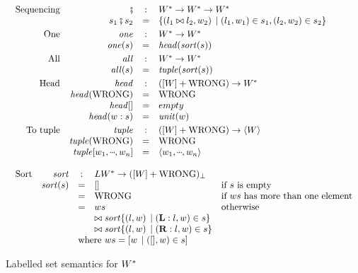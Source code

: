 \begin{figure}
$$\begin{array}{l}
\begin{array}{rrcll}
\text{Sequencing} & \msemi & : & \mtype \rightarrow \mtype \rightarrow \mtype \\
&  s_1 \msemi s_2 & = & \scompr{(\lblsemi{l_1}{l_2}, w_2)}{\sbind{(l_1,w_1)}{s_1}, \sbind{(l_2,w_2)}{s_2}} \\[1mm]
\text{One}  & \mone & : & \mtype \rightarrow \mtype \\
& \mone(s) & = & \shead (\msort( s)) \\[1mm]
\text{All}  & \mall & : & \mtype \rightarrow \mtype \\
 & \mall(s) & = & \stuple (\msort( s) ) \\[1mm]
\text{Head}  & \shead & : & ([\Value] + \wrong) \rightarrow \mtype \\
             & \shead(\wrong) & = & \wrong \\
             & \shead [] & = & empty \\
             & \shead (w \scons s) & = & \munits{w} \\[1mm]
\text{To tuple} & \stuple & : & ([\Value] + \wrong) \rightarrow \tuple{\Value} \\
     & \stuple(\wrong) & = & \wrong \\
     & \stuple [w_1, \mydots, w_n] & = & \tuple{w_1,\mydots,w_n} \\
  \end{array} \\
\\
\begin{array}{rrcll}
\text{Sort} & \msort & : & \LblValue^{*} \rightarrow \mlift{([\Value] + \wrong)}\\
& \msort(s) & = & []  & \text{if $s$ is empty} \\
&  & = & \wrong & \text{if $ws$ has more than one element} \\
&& = & ws & \text{otherwise} \\
  &&& \sconcat \msort \scompr{(l,w)}{\sbind{(\lblleft:l,w)}{s}} \\
  &&& \sconcat \msort \scompr{(l,w)}{\sbind{(\lblright:l,w)}{s}} \\
&& \multicolumn{3}{l}{\text{where $ws = \mcompr{w}{\sbind{([],w)}{s}}$}}
\end{array}

\end{array}
$$
\caption{Labelled set semantics for $\mtype$}
\label{fig:labelled-sem}
\end{figure}

